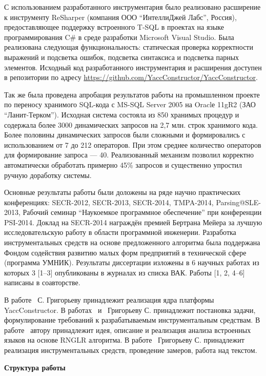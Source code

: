 С использованием разработанного инструментария было реализовано расширение к инструменту ReSharper (компания ООО ``ИнтеллиДжей Лабс'', Россия), предоставляющее поддержку встроенного T-SQL в проектах на языке программирования C\# в среде разработки Microsoft Visual Studio. Была реализована следующая функциональность: статическая проверка корректности выражений и подсветка ошибок, подсветка синтаксиса и подсветка парных элементов. Исходный код разработанного инструментария и расширения доступен в репозитории по адресу \url{https://github.com/YaccConstructor/YaccConstructor}.

Так же была проведена апробация результатов работы на промышленном проекте по переносу хранимого SQL-кода с MS-SQL Server 2005 на Oraclе 11gR2 (ЗАО ``Ланит-Терком''). Исходная система состояла из 850 хранимых процедур и содержала более 3000 динамических запросов на 2,7 млн. строк хранимого кода. Более половины динамических запросов были сложными и формировались с использованием от 7 до 212 операторов. При этом среднее количество операторов для формирование запроса --- 40. Реализованный механизм позволил корректно автоматически обработать примерно 45\% запросов и существенно упростил ручную доработку системы.

Основные результаты работы были доложены на ряде научно практических конференциях: SECR-2012, SECR-2013, SECR-2014, TMPA-2014, Parsing@SLE-2013, Рабочий семинар ``Наукоемкое программное обеспечение'' при конференции PSI-2014. Доклад на SECR-2014 награждён премией Бертрана Мейера за лучшую исследовательскую работу в области программной инженерии. Разработка инструментальных средств на основе предложенного алгоритма была поддержана Фондом содействия развитию малых форм предприятий в технической сфере (программа УМНИК). Результаты диссертации изложены в 6 научных работах из которых 3 [1–3] опубликованы в журналах из списка ВАК. Работы [1, 2, 4–6] написаны в соавторстве.

В работе~\cite{YCArticle} С. Григорьеву принадлежит реализация ядра платформы \\ YaccConstructor. В работах~\cite{!!!} и~\cite{SELforIDE} Григорьеву С. принадлежит постановка задачи, формулирование требований к разрабатываемым инструментальным средствам. В работе~\cite{GLRAbsPars} автору принадлежит идея, описание и реализация анализа встроенных языков на основе RNGLR алгоритма. В работе~\cite{Syrcose} Григорьеву С. принадлежит реализация инструментальных средств, проведение замеров, работа над текстом.

\textbf{Структура работы}

